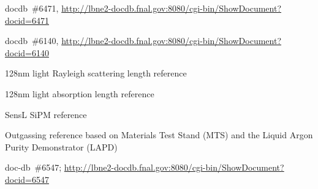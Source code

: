 \begin{thebibliography}{99}
 docdb~\#6471, \url{http://lbne2-docdb.fnal.gov:8080/cgi-bin/ShowDocument?docid=6471}

 docdb~\#6140, \url{http://lbne2-docdb.fnal.gov:8080/cgi-bin/ShowDocument?docid=6140}

 128nm light Rayleigh scattering length reference

 128nm light absorption length reference


 SensL SiPM reference

 Outgassing reference based on Materials Test Stand (MTS) and the Liquid Argon Purity Demonstrator (LAPD)

 doc-db~\#6547; \url{http://lbne2-docdb.fnal.gov:8080/cgi-bin/ShowDocument?docid=6547}

\end{thebibliography}
